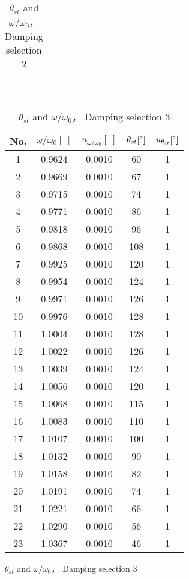 \begin{figure}[H]
\begin{minipage}{0.4\textwidth}
\begin{table}[H]
\begin{tabular}{|c|c|c|c|c|}
            \end{tabular}
            \caption{$\theta_{st}$ and $\omega/\omega_0$， Damping selection 2}\label{data_theta2}
        \end{table}
    \end{minipage}
    ~
    \begin{minipage}{0.4\textwidth}
        \begin{table}[H]
        \centering
            \begin{tabular}{|c|c|c|c|c|}
                \hline
                No. & $\omega/\omega_0[\ ]$ & $u_{\omega/\omega_0}[\ ]$ & $\theta_{st}[^\circ]$ & $u_{\theta_{st}}[^\circ]$\\\hline
                1 & 0.9624 & 0.0010 & 60 & 1\\\hline
                2 & 0.9669 & 0.0010 & 67 & 1\\\hline
                3 & 0.9715 & 0.0010 & 74 & 1\\\hline
                4 & 0.9771 & 0.0010 & 86 & 1\\\hline
                5 & 0.9818 & 0.0010 & 96 & 1\\\hline
                6 & 0.9868 & 0.0010 & 108 & 1\\\hline
                7 & 0.9925 & 0.0010 & 120 & 1\\\hline
                8 & 0.9954 & 0.0010 & 124 & 1\\\hline
                9 & 0.9971 & 0.0010 & 126 & 1\\\hline
                10 & 0.9976 & 0.0010 & 128 & 1\\\hline
                11 & 1.0004 & 0.0010 & 128 & 1\\\hline
                12 & 1.0022 & 0.0010 & 126 & 1\\\hline
                13 & 1.0039 & 0.0010 & 124 & 1\\\hline
                14 & 1.0056 & 0.0010 & 120 & 1\\\hline
                15 & 1.0068 & 0.0010 & 115 & 1\\\hline
                16 & 1.0083 & 0.0010 & 110 & 1\\\hline
                17 & 1.0107 & 0.0010 & 100 & 1\\\hline
                18 & 1.0132 & 0.0010 & 90 & 1\\\hline
                19 & 1.0158 & 0.0010 & 82 & 1\\\hline
                20 & 1.0191 & 0.0010 & 74 & 1\\\hline
                21 & 1.0221 & 0.0010 & 66 & 1\\\hline
                22 & 1.0290 & 0.0010 & 56 & 1\\\hline
                23 & 1.0367 & 0.0010 & 46 & 1\\\hline
            \end{tabular}
            \caption{$\theta_{st}$ and $\omega/\omega_0$， Damping selection 3}\label{data_theta3}
        \end{table}
    \end{minipage}
    \end{figure}
